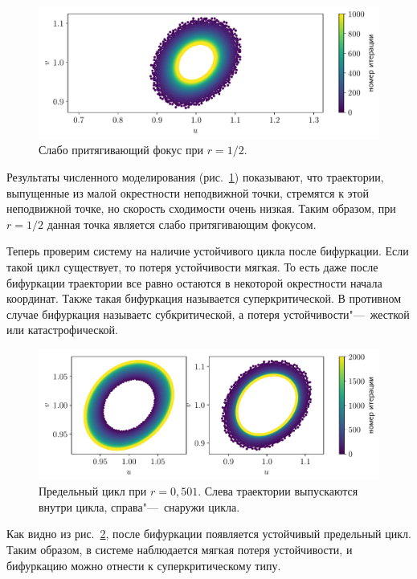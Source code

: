 \documentclass[12pt, a4paper]{article} %
\begin{document}
\begin{figure}[ht]
    \centering
    \includegraphics[width=\textwidth]{figures/weak_focus.pdf}
    \caption{Слабо притягивающий фокус при $r=1\!/2$.}
    \label{fig:weak_focus}
\end{figure}

Результаты численного моделирования (рис.~\ref{fig:weak_focus}) показывают,
что траектории, выпущенные из малой окрестности неподвижной точки,
стремятся к этой неподвижной точке, но скорость сходимости очень низкая. 
Таким образом, при $r = 1\!/2$ данная точка является слабо притягивающим фокусом.

Теперь проверим систему на наличие устойчивого цикла после бифуркации.
Если такой цикл существует, то потеря устойчивости мягкая. 
То есть даже после бифуркации траектории все равно остаются в некоторой окрестности начала координат.
Также такая бифуркация называется суперкритической.
В противном случае бифуркация называетс субкритической, а потеря устойчивости"---~жесткой или катастрофической.

\begin{figure}[ht]
    \centering
    \includegraphics[width=\textwidth]{figures/cycle_after_bifurc.pdf}
    \caption{Предельный цикл при $r = 0{,}501$. Слева траектории выпускаются внутри цикла, справа"---~снаружи цикла.}
    \label{fig:cycle_after_bifurc}
\end{figure}

Как видно из рис.~\ref{fig:cycle_after_bifurc}, после бифуркации появляется 
устойчивый предельный цикл.
Таким образом, в системе наблюдается мягкая потеря устойчивости, и бифуркацию можно отнести к суперкритическому типу.



 
\end{document}
